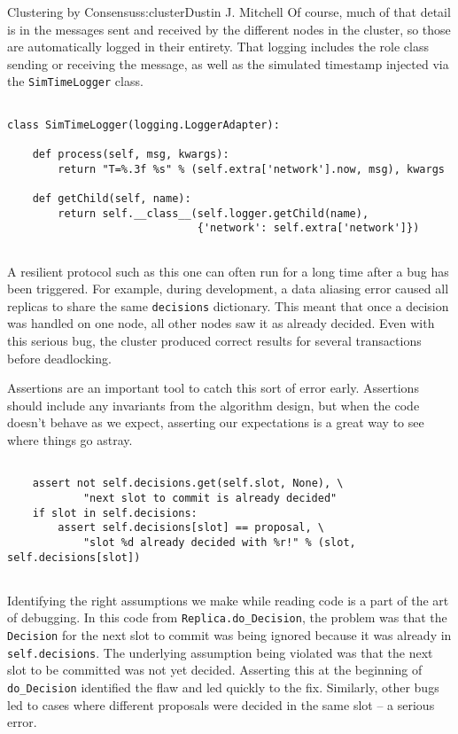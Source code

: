 \begin{aosachapter}{Clustering by Consensus}{s:cluster}{Dustin J. Mitchell}
Of course, much of that detail is in the messages sent and received by
the different nodes in the cluster, so those are automatically logged in
their entirety. That logging includes the role class sending or
receiving the message, as well as the simulated timestamp injected via
the \texttt{SimTimeLogger} class.

\begin{verbatim}

class SimTimeLogger(logging.LoggerAdapter):

    def process(self, msg, kwargs):
        return "T=%.3f %s" % (self.extra['network'].now, msg), kwargs

    def getChild(self, name):
        return self.__class__(self.logger.getChild(name),
                              {'network': self.extra['network']})
    
\end{verbatim}

A resilient protocol such as this one can often run for a long time
after a bug has been triggered. For example, during development, a data
aliasing error caused all replicas to share the same \texttt{decisions}
dictionary. This meant that once a decision was handled on one node, all
other nodes saw it as already decided. Even with this serious bug, the
cluster produced correct results for several transactions before
deadlocking.

Assertions are an important tool to catch this sort of error early.
Assertions should include any invariants from the algorithm design, but
when the code doesn't behave as we expect, asserting our expectations is
a great way to see where things go astray.

\begin{verbatim}

    assert not self.decisions.get(self.slot, None), \
            "next slot to commit is already decided"
    if slot in self.decisions:
        assert self.decisions[slot] == proposal, \
            "slot %d already decided with %r!" % (slot, self.decisions[slot])
    
\end{verbatim}

Identifying the right assumptions we make while reading code is a part
of the art of debugging. In this code from
\texttt{Replica.do\_Decision}, the problem was that the
\texttt{Decision} for the next slot to commit was being ignored because
it was already in \texttt{self.decisions}. The underlying assumption
being violated was that the next slot to be committed was not yet
decided. Asserting this at the beginning of \texttt{do\_Decision}
identified the flaw and led quickly to the fix. Similarly, other bugs
led to cases where different proposals were decided in the same slot --
a serious error.


\end{aosachapter}
